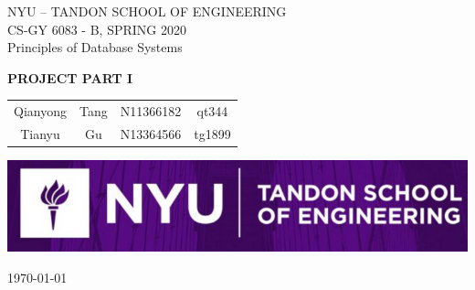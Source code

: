 \documentclass[12pt,english, openany]{book}
\begin{document}

\begin{titlepage}
	\clearpage\thispagestyle{empty}
	\centering
	\vspace{1cm}

	{\normalsize NYU – TANDON SCHOOL OF ENGINEERING \\ 
		CS-GY 6083 - B, SPRING 2020 \\
		Principles of Database Systems \par}
		\vspace{3cm}
	{\Huge \textbf{PROJECT PART I}} \\
	\vspace{1cm}
	\begin{table}[H]
	\centering
    \begin{tabular}{cccc}
    Qianyong & Tang & N11366182 & qt344 \\
    Tianyu   & Gu   & N13364566 & tg1899     
    \end{tabular}
    \end{table}
	\vspace{6cm}
    
    \centering \includegraphics[scale=0.8]{Tandon-Engineering.png}
    
    \vspace{0.5cm}
		
	{\normalsize \today \par}
	
	\pagebreak

\end{titlepage}

\tableofcontents{}

\mainmatter
\end{document}
